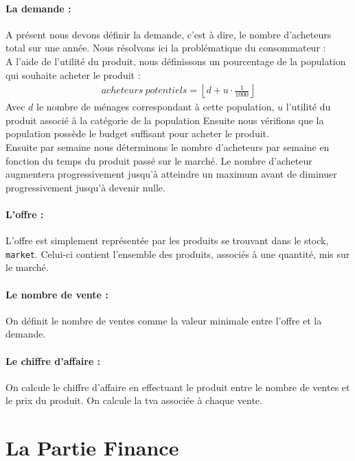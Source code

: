 \paragraph{La demande :} A présent nous devons définir la demande, c'est à dire, le nombre d'acheteurs total sur une année. Nous résolvons ici la problématique du consommateur : \\
	A l'aide de l'utilité du produit, nous définissons un pourcentage de la population qui souhaite acheter le produit :
\begin{align*}
	acheteurs\ potentiels = \left\lfloor  d + u\cdot\frac{1}{1000}\right\rfloor
\end{align*}
Avec $d$ le nombre de ménages correspondant à cette population, $u$ l'utilité du produit associé à la catégorie de la population 
	Ensuite nous vérifions que la population possède le budget suffisant pour acheter le produit. \\
\noindent
Ensuite par semaine nous déterminons le nombre d'acheteurs par semaine en fonction du temps du produit passé sur le marché. Le nombre d'acheteur augmentera progressivement jusqu'à atteindre un maximum avant de diminuer progressivement jusqu'à devenir nulle.
\paragraph{L'offre :} L'offre est simplement représentée par les produits se trouvant dans le stock, \texttt{market}. Celui-ci contient l'ensemble des produits, associés à une quantité, mis sur le marché.
\paragraph{Le nombre de vente :} On définit le nombre de ventes comme la valeur  minimale entre l'offre et la demande. 
\paragraph{Le chiffre d'affaire :} On calcule le chiffre d'affaire en effectuant le produit entre le nombre de ventes et le prix du produit. On calcule la tva associée à chaque vente.








\section{La Partie Finance}



